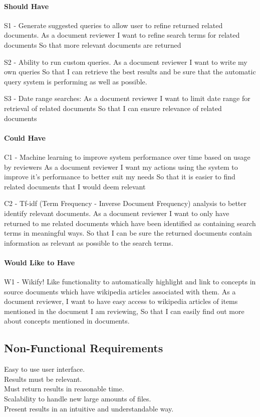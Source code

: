 \documentclass{l4proj}
\begin{document}
\paragraph{Should Have}
S1 - Generate suggested queries to allow user to refine returned related documents.
      As a document reviewer
      I want to refine search terms for related documents
      So that more relevant documents are returned

S2 - Ability to run custom queries.
      As a document reviewer
      I want to write my own queries
      So that I can retrieve the best results and be sure that the automatic query system is performing as well as possible.

S3 - Date range searches:
      As a document reviewer
      I want to limit date range for retrieval of related documents
      So that I can ensure relevance of related documents

\paragraph{Could Have}
C1 - Machine learning to improve system performance over time based on usage by reviewers
	As a document reviewer
	I want my actions using the system to improve it’s performance to better suit my needs
	So that it is easier to find related documents that I would deem relevant

C2 - Tf-idf (Term Frequency - Inverse Document Frequency) analysis to better identify relevant documents.
      As a document reviewer
      I want to only have returned to me related documents which have been identified as containing search terms in meaningful ways.
      So that I can be sure the returned documents contain information as relevant as possible to the search terms.

\paragraph{Would Like to Have}
W1 - Wikify! Like functionality to automatically highlight and link to concepts in source documents which have wikipedia articles associated with them.
      As a document reviewer,
      I want to have easy access to wikipedia articles of items mentioned in the document I am reviewing,
      So that I can easily find out more about concepts mentioned in documents.

\subsection{Non-Functional Requirements}
Easy to use user interface. \\
Results must be relevant. \\
Must return results in reasonable time. \\
Scalability to handle new large amounts of files. \\
Present results in an intuitive and understandable way. \\
\end{document}
